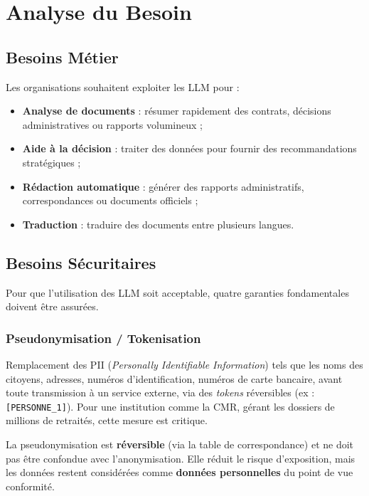 \documentclass[12pt, a4paper]{report}
\begin{document}
\section{Analyse du Besoin}

\subsection{Besoins Métier}

Les organisations souhaitent exploiter les LLM pour :

\begin{itemize}
  \item \textbf{Analyse de documents} : résumer rapidement des contrats,
        décisions administratives ou rapports volumineux ;
  \item \textbf{Aide à la décision} : traiter des données pour fournir
        des recommandations stratégiques ;
  \item \textbf{Rédaction automatique} : générer des rapports
        administratifs, correspondances ou documents officiels ;
  \item \textbf{Traduction} : traduire des documents entre plusieurs
        langues.
\end{itemize}

\subsection{Besoins Sécuritaires}

Pour que l'utilisation des LLM soit acceptable, quatre garanties
fondamentales doivent être assurées.

\subsubsection{Pseudonymisation / Tokenisation}

Remplacement des PII (\textit{Personally Identifiable Information}) tels
que les noms des citoyens, adresses, numéros d'identification, numéros de
carte bancaire, avant toute transmission à un service externe, via des
\textit{tokens} réversibles (ex : \texttt{[PERSONNE\_1]}). Pour une
institution comme la CMR, gérant les dossiers de millions de retraités,
cette mesure est critique.

\begin{tcolorbox}[cmrbox, title={Remarque importante}]
La pseudonymisation est \textbf{réversible} (via la table de
correspondance) et ne doit pas être confondue avec l'anonymisation.
Elle réduit le risque d'exposition, mais les données restent considérées
comme \textbf{données personnelles} du point de vue conformité.
\end{tcolorbox}
\end{document}

